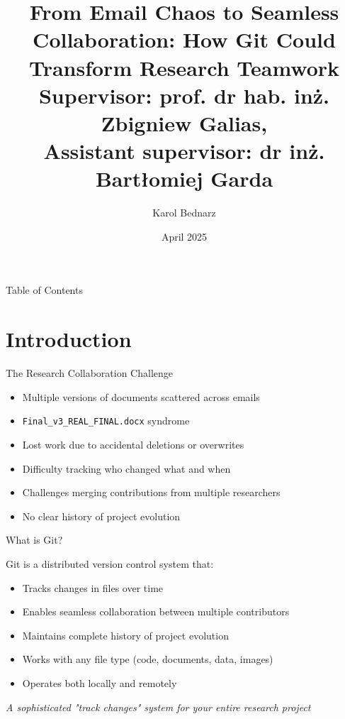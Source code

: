 \documentclass[aspectratio=1609]{beamer}
\title{From Email Chaos to Seamless Collaboration: How Git Could Transform Research Teamwork\\
\small Supervisor: prof. dr hab. inż. Zbigniew Galias, \\
Assistant supervisor: dr inż. Bartłomiej Garda
}
\date{April 2025}
\author{Karol Bednarz}
\begin{document}
\begin{frame}
\titlepage
\end{frame}

\begin{frame}{Table of Contents}
    \tableofcontents
\end{frame}

\section{Introduction}
\begin{frame}[fragile]{The Research Collaboration Challenge}
    \begin{tblock}{}
        \begin{itemize}
            \item Multiple versions of documents scattered across emails
            \item \verb|Final_v3_REAL_FINAL.docx| syndrome
            \item Lost work due to accidental deletions or overwrites
            \item Difficulty tracking who changed what and when
            \item Challenges merging contributions from multiple researchers
            \item No clear history of project evolution
        \end{itemize}
    \end{tblock}
\end{frame}

\begin{frame}{What is Git?}
    \begin{tblock}{Git is a distributed version control system that:}
        \begin{itemize}
            \item Tracks changes in files over time
            \item Enables seamless collaboration between multiple contributors
            \item Maintains complete history of project evolution
            \item Works with any file type (code, documents, data, images)
            \item Operates both locally and remotely
        \end{itemize}
    \end{tblock}
    \begin{talert}{}
        \emph{A sophisticated "track changes" system for your entire research project}
    \end{talert}
\end{frame}
\end{document}
